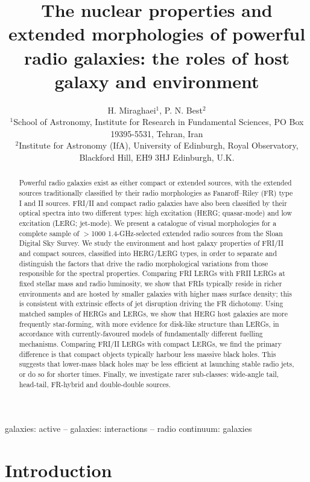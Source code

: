 \documentclass[usenatbib]{mn2e}
\title[]{The nuclear properties and extended morphologies of powerful radio galaxies: the roles of host galaxy and environment }
\author [H. Miraghaei, et al]{H. Miraghaei$^{1}$, P. N. Best$^2$ \\
$^{1}$School of Astronomy, Institute for Research in Fundamental Sciences, PO Box 19395-5531, Tehran, Iran\\
$^{2}$Institute for Astronomy (IfA), University of Edinburgh, Royal Observatory, Blackford Hill, EH9 3HJ Edinburgh, U.K.\\
}
\begin{document}
\date{}
\pagerange{\pageref{firstpage}--\pageref{lastpage}} \pubyear{}

\maketitle

\label{firstpage}
\begin{abstract}

Powerful radio galaxies exist as either compact or extended sources,
with the extended sources traditionally classified by their radio
morphologies as Fanaroff--Riley (FR) type I and II sources. FRI/II and
compact radio galaxies have also been classified by their optical
spectra into two different types: high excitation (HERG; quasar-mode)
and low excitation (LERG; jet-mode). We present a catalogue of visual
morphologies for a complete sample of $>$1000 1.4-GHz-selected
extended radio sources from the Sloan Digital Sky Survey. We study the
environment and host galaxy properties of FRI/II and compact sources,
classified into HERG/LERG types, in order to separate and distinguish
the factors that drive the radio morphological variations from those
responsible for the spectral properties. Comparing FRI LERGs with FRII
LERGs at fixed stellar mass and radio luminosity, we show that FRIs
typically reside in richer environments and are hosted by smaller
galaxies with higher mass surface density; this is consistent with
extrinsic effects of jet disruption driving the FR dichotomy. Using
matched samples of HERGs and LERGs, we show that HERG host galaxies
are more frequently star-forming, with more evidence for disk-like
structure than LERGs, in accordance with currently-favoured models of
fundamentally different fuelling mechanisms. Comparing FRI/II LERGs
with compact LERGs, we find the primary difference is that compact
objects typically harbour less massive black holes. This suggests that
lower-mass black holes may be less efficient at launching stable radio
jets, or do so for shorter times. Finally, we investigate rarer
sub-classes: wide-angle tail, head-tail, FR-hybrid and double-double
sources.

\end{abstract}

\begin{keywords}
galaxies: active -- galaxies: interactions -- radio continuum: galaxies

\end{keywords}
\section{Introduction}
\label{sec:Intro}
\end{document}
